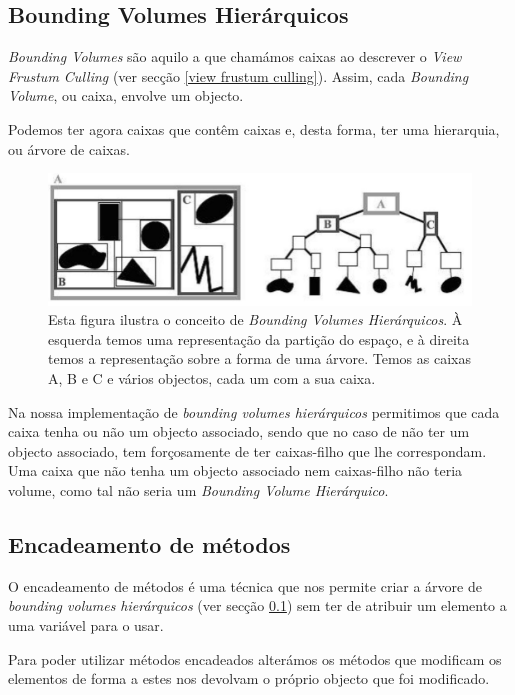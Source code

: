 \documentclass[a5paper,onecolumn, 11pt]{article}
\begin{document}
\subsection{Bounding Volumes Hierárquicos} \label{bounding volumes hierarquicos}
\textit{Bounding Volumes} são aquilo a que chamámos caixas ao descrever o \textit{View Frustum Culling} (ver secção \ref{view frustum culling}). Assim, cada \textit{Bounding Volume}, ou caixa, envolve um objecto.

Podemos ter agora caixas que contêm caixas e, desta forma, ter uma hierarquia, ou árvore de caixas.

\begin{figure}[!htb]
    \centering
    \includegraphics[scale=0.5]{boundingV.jpg}
    \caption[Demonstração de Bounding Volumes Hierárquicos]{Esta figura ilustra o conceito de \textit{Bounding Volumes Hierárquicos}. À esquerda temos uma representação da partição do espaço, e à direita temos a representação sobre a forma de uma árvore. Temos as caixas A, B e C e vários objectos, cada um com a sua caixa.}
\end{figure}

Na nossa implementação de \textit{bounding volumes hierárquicos} permitimos que cada caixa tenha ou não um objecto associado, sendo que no caso de não ter um objecto associado, tem forçosamente de ter caixas-filho que lhe correspondam. Uma caixa que não tenha um objecto associado nem caixas-filho não teria volume, como tal não seria um \textit{Bounding Volume Hierárquico}.

\subsection{Encadeamento de métodos}
O encadeamento de métodos é uma técnica que nos permite criar a árvore de \textit{bounding volumes hierárquicos} (ver secção \ref{bounding volumes hierarquicos}) sem ter de atribuir um elemento a uma variável para o usar.

Para poder utilizar métodos encadeados alterámos os métodos que modificam os elementos de forma a estes nos devolvam o próprio objecto que foi modificado. 
\end{document}
